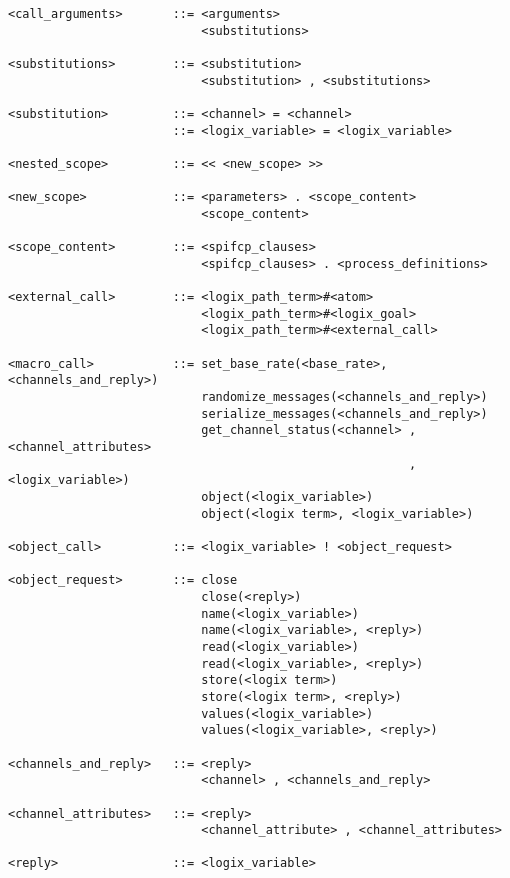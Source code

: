 \documentclass[twoside,10pt]{report}
\begin{document}
\begin{verbatim}
<call_arguments>       ::= <arguments>
                           <substitutions>

<substitutions>        ::= <substitution>
                           <substitution> , <substitutions>

<substitution>         ::= <channel> = <channel>
                       ::= <logix_variable> = <logix_variable>

<nested_scope>         ::= << <new_scope> >>

<new_scope>            ::= <parameters> . <scope_content>
                           <scope_content>

<scope_content>        ::= <spifcp_clauses>
                           <spifcp_clauses> . <process_definitions>

<external_call>        ::= <logix_path_term>#<atom>
                           <logix_path_term>#<logix_goal>
                           <logix_path_term>#<external_call>

<macro_call>           ::= set_base_rate(<base_rate>, <channels_and_reply>)
                           randomize_messages(<channels_and_reply>)
                           serialize_messages(<channels_and_reply>)
                           get_channel_status(<channel> , <channel_attributes>
                                                        , <logix_variable>)
                           object(<logix_variable>)
                           object(<logix term>, <logix_variable>)

<object_call>          ::= <logix_variable> ! <object_request>

<object_request>       ::= close
                           close(<reply>)
                           name(<logix_variable>)
                           name(<logix_variable>, <reply>)
                           read(<logix_variable>)
                           read(<logix_variable>, <reply>)
                           store(<logix term>)
                           store(<logix term>, <reply>)
                           values(<logix_variable>)
                           values(<logix_variable>, <reply>)

<channels_and_reply>   ::= <reply>
                           <channel> , <channels_and_reply>

<channel_attributes>   ::= <reply>
                           <channel_attribute> , <channel_attributes>

<reply>                ::= <logix_variable>

\end{verbatim}
\end{document}
